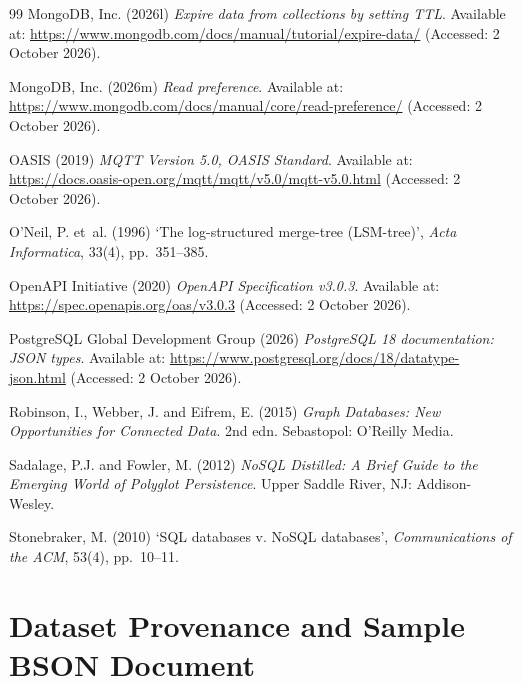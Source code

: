 \documentclass[11pt,a4paper]{article}
\begin{document}
\begin{thebibliography}{99}
 MongoDB, Inc. (2026l) \textit{Expire data from collections by setting TTL}. Available at: \url{https://www.mongodb.com/docs/manual/tutorial/expire-data/} (Accessed: 2 October 2026).

 MongoDB, Inc. (2026m) \textit{Read preference}. Available at: \url{https://www.mongodb.com/docs/manual/core/read-preference/} (Accessed: 2 October 2026).

 OASIS (2019) \textit{MQTT Version 5.0, OASIS Standard}. Available at: \url{https://docs.oasis-open.org/mqtt/mqtt/v5.0/mqtt-v5.0.html} (Accessed: 2 October 2026).

 O'Neil, P. et~al. (1996) `The log-structured merge-tree (LSM-tree)', \textit{Acta Informatica}, 33(4), pp.~351--385.

 OpenAPI Initiative (2020) \textit{OpenAPI Specification v3.0.3}. Available at: \url{https://spec.openapis.org/oas/v3.0.3} (Accessed: 2 October 2026).

 PostgreSQL Global Development Group (2026) \textit{PostgreSQL 18 documentation: JSON types}. Available at: \url{https://www.postgresql.org/docs/18/datatype-json.html} (Accessed: 2 October 2026).

 Robinson, I., Webber, J. and Eifrem, E. (2015) \textit{Graph Databases: New Opportunities for Connected Data}. 2nd edn. Sebastopol: O'Reilly Media.

 Sadalage, P.J. and Fowler, M. (2012) \textit{NoSQL Distilled: A Brief Guide to the Emerging World of Polyglot Persistence}. Upper Saddle River, NJ: Addison-Wesley.

 Stonebraker, M. (2010) `SQL databases v. NoSQL databases', \textit{Communications of the ACM}, 53(4), pp.~10--11.

\end{thebibliography}

\clearpage
\appendix
\section{Dataset Provenance and Sample BSON Document}
\end{document}

